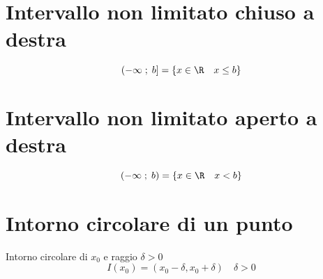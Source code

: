 \section{Intervallo non limitato chiuso a destra}
\begin{equation*}
\left(-\infty\; ;\; b\right]=\lbrace x\in\R\quad x\leq b\rbrace
\end{equation*}
\section{Intervallo non limitato aperto a destra}
\begin{equation*}
\left(-\infty\; ;\; b\right)=\lbrace x\in\R\quad x< b\rbrace
\end{equation*}
\section{Intorno circolare di un punto}
Intorno circolare di $x_0$ e raggio $\delta>0$
\begin{equation*}
I(x_0)=\left(x_0-\delta,x_0+\delta
\right)\quad\delta>0
\end{equation*}